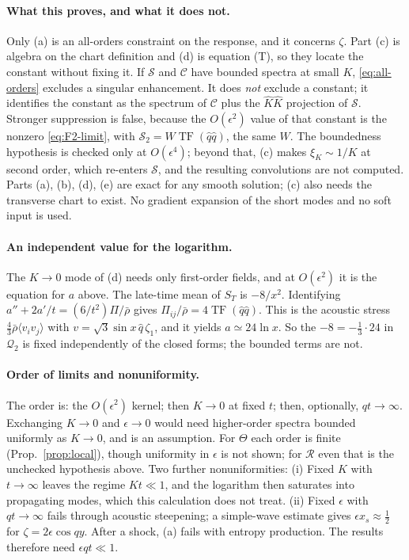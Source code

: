 \documentclass[10pt]{article}
\newcommand{\eps}{\epsilon}
\newcommand{\TF}{\operatorname{TF}}
\newcommand{\Q}{\mathcal Q_2}
\newcommand{\R}{\mathcal R}
\newcommand{\Kh}{\hat K}
\newcommand{\qh}{\hat q}
\begin{document}
\paragraph{What this proves, and what it does not.} Only (a) is an all-orders constraint on the response, and it concerns $\zeta$. Part (c) is algebra on the chart definition and (d) is equation (T), so they locate the constant without fixing it. If $\mathcal S$ and $\mathcal C$ have bounded spectra at small $K$, \eqref{eq:all-orders} excludes a singular enhancement. It does \emph{not} exclude a constant; it identifies the constant as the spectrum of $\mathcal C$ plus the $\Kh\Kh$ projection of $\mathcal S$. Stronger suppression is false, because the $O(\eps^2)$ value of that constant is the nonzero \eqref{eq:F2-limit}, with $\mathcal S_2=W\TF(\qh\qh)$, the same $W$. The boundedness hypothesis is checked only at $O(\eps^4)$; beyond that, (c) makes $\xi_K\sim1/K$ at second order, which re-enters $\mathcal S$, and the resulting convolutions are not computed. Parts (a), (b), (d), (e) are exact for any smooth solution; (c) also needs the transverse chart to exist. No gradient expansion of the short modes and no soft input is used.

\paragraph{An independent value for the logarithm.} The $K\to0$ mode of (d) needs only first-order fields, and at $O(\eps^2)$ it is the equation for $a$ above. The late-time mean of $S_T$ is $-8/x^2$. Identifying $a''+2a'/t=(6/t^2)\Pi/\bar\rho$ gives $\Pi_{ij}/\bar\rho=4\TF(\qh\qh)$. This is the acoustic stress $\frac43\bar\rho\langle v_iv_j\rangle$ with $v=\sqrt3\sin x\,\qh\,\zeta_1$, and it yields $a\simeq24\ln x$. So the $-8=-\frac13\cdot24$ in $\Q$ is fixed independently of the closed forms; the bounded terms are not.

\paragraph{Order of limits and nonuniformity.} The order is: the $O(\eps^2)$ kernel; then $K\to0$ at fixed $t$; then, optionally, $qt\to\infty$. Exchanging $K\to0$ and $\eps\to0$ would need higher-order spectra bounded uniformly as $K\to0$, and is an assumption. For $\Theta$ each order is finite (Prop.~\ref{prop:local}), though uniformity in $\eps$ is not shown; for $\R$ even that is the unchecked hypothesis above. Two further nonuniformities: (i) Fixed $K$ with $t\to\infty$ leaves the regime $Kt\ll1$, and the logarithm then saturates into propagating modes, which this calculation does not treat. (ii) Fixed $\eps$ with $qt\to\infty$ fails through acoustic steepening; a simple-wave estimate gives $\eps x_s\approx\frac12$ for $\zeta=2\eps\cos qy$. After a shock, (a) fails with entropy production. The results therefore need $\eps qt\ll1$.
\end{document}
